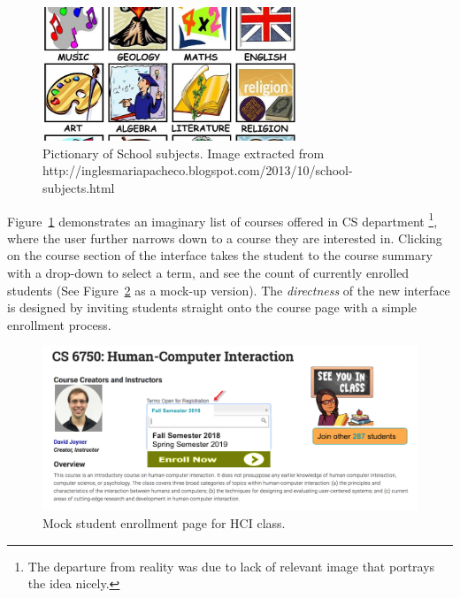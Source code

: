 \documentclass[12pt,letterpaper]{article}
\begin{document}
\begin{figure}[h]
\centering
\includegraphics[width=3in,scale=.3]{figures/p2/school_subjects_modified.jpg}
\caption{Pictionary of School subjects. Image extracted from http://inglesmariapacheco.blogspot.com/2013/10/school-subjects.html}
\label{fig::1}
\end{figure}

Figure~\ref{fig::1} demonstrates an imaginary list of courses offered in CS department \footnote{The departure from reality was due to lack of relevant image that portrays the idea nicely.}, where the user further narrows down to a course they are interested in. Clicking on the course section of the interface takes the student to the course summary with a drop-down to select a term, and see the count of currently enrolled students (See Figure~\ref{fig::2} as a mock-up version). The \textit{directness} of the new interface is designed by inviting students straight onto the course page with a simple enrollment process. 

\begin{figure}[h]
\centering
\includegraphics[scale=.5]{figures/p2/gatech_enrollment.png}
\caption{Mock student enrollment page for HCI class.}
\label{fig::2}
\end{figure}
\end{document}
